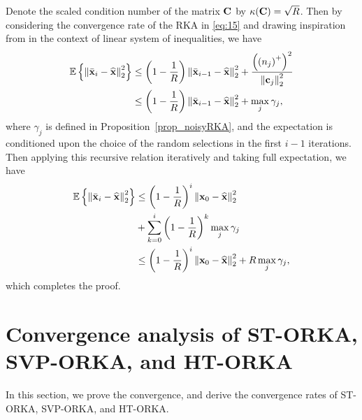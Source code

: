 \documentclass[12pt,draftcls,onecolumn]{IEEEtran}
\begin{document}
Denote the scaled condition number of the matrix $\mathbf{C}$ by $\kappa(\mathbf{C})=\sqrt{R}$. Then by considering the convergence rate of the RKA in \eqref{eq:15} and drawing inspiration from \cite[Lemma~2.2]{needell2010randomized} in the context of linear system of inequalities, we have
\begin{equation}
\label{A5_6}
\begin{aligned}
\mathbb{E}\left\{\left\|\bar{\mbx}_{i}-\widehat{\mbx}\right\|_{2}^{2}\right\}&\leq\left(1-\frac{1}{R}\right)\left\|\bar{\mbx}_{i-1}-\widehat{\mbx}\right\|_{2}^{2}+\frac{\left(\left(n_{j}\right)^{+}\right)^2}{\left\|\mbc_{j}\right\|_{2}^{2}}\\&\leq\left(1-\frac{1}{R}\right)\left\|\bar{\mbx}_{i-1}-\widehat{\mbx}\right\|_{2}^{2}+\max_{j}\gamma_{j},
\end{aligned}
\end{equation}
where $\gamma_{j}$ is defined in Proposition~\ref{prop_noisyRKA}, and the expectation is conditioned upon the choice of the random selections in the first $i-1$ iterations. Then applying this recursive relation iteratively and taking full expectation, we have
\begin{equation}
\label{A5_7}
\begin{aligned}
\mathbb{E}\left\{\left\|\bar{\mbx}_{i}-\widehat{\mbx}\right\|_{2}^{2}\right\}&\leq\left(1-\frac{1}{R}\right)^{i}\left\|\mbx_{0}-\widehat{\mbx}\right\|_{2}^{2}\\&+\sum_{k=0}^{i}\left(1-\frac{1}{R}\right)^k\max_{j}\gamma_{j}\\&\leq\left(1-\frac{1}{R}\right)^{i}\left\|\mbx_{0}-\widehat{\mbx}\right\|_{2}^{2}+R\max_{j}\gamma_{j},
\end{aligned}
\end{equation}
which completes the proof.

\section{Convergence analysis of ST-ORKA, SVP-ORKA, and HT-ORKA}
\label{MY-ST}
In this section, we prove the convergence, and derive the convergence rates of ST-ORKA, SVP-ORKA, and HT-ORKA. %
\end{document}
